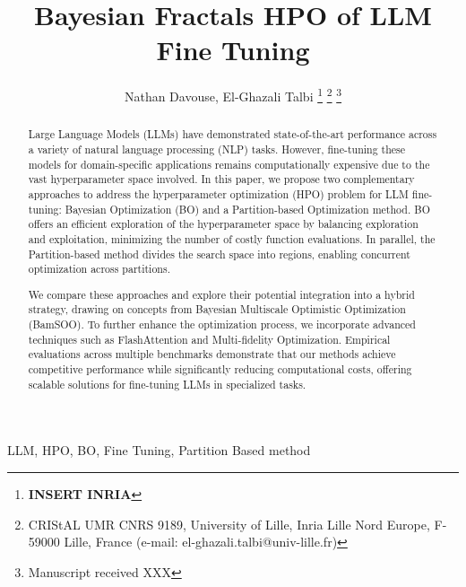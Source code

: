 \documentclass[conference]{IEEEtran}
\begin{document}
\linenumbers
\title{Bayesian Fractals HPO of LLM Fine Tuning }
\author{Nathan Davouse, El-Ghazali Talbi
\thanks{\textbf{INSERT INRIA}}%
\thanks{CRIStAL UMR CNRS 9189, University of Lille, Inria Lille Nord Europe, F-59000 Lille, France (e-mail: el-ghazali.talbi@univ-lille.fr)}%
\thanks{Manuscript received XXX}}

\maketitle

\begin{abstract}
Large Language Models (LLMs) have demonstrated state-of-the-art performance across a variety of natural language processing (NLP) tasks. However, fine-tuning these models for domain-specific applications remains computationally expensive due to the vast hyperparameter space involved. In this paper, we propose two complementary approaches to address the hyperparameter optimization (HPO) problem for LLM fine-tuning: Bayesian Optimization (BO) and a Partition-based Optimization method. BO offers an efficient exploration of the hyperparameter space by balancing exploration and exploitation, minimizing the number of costly function evaluations. In parallel, the Partition-based method divides the search space into regions, enabling concurrent optimization across partitions. 

We compare these approaches and explore their potential integration into a hybrid strategy, drawing on concepts from Bayesian Multiscale Optimistic Optimization (BamSOO). To further enhance the optimization process, we incorporate advanced techniques such as FlashAttention and Multi-fidelity Optimization. Empirical evaluations across multiple benchmarks demonstrate that our methods achieve competitive performance while significantly reducing computational costs, offering scalable solutions for fine-tuning LLMs in specialized tasks.
\end{abstract}

\begin{IEEEkeywords}
LLM, HPO, BO, Fine Tuning, Partition Based method
\end{IEEEkeywords}










\clearpage









\end{document}
